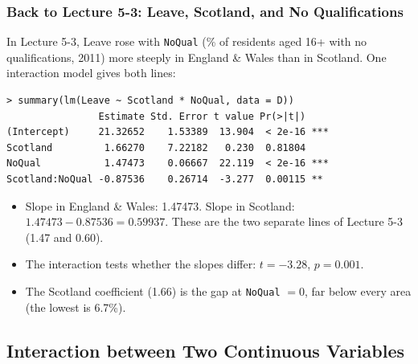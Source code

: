 \documentclass[xcolor=svgnames,9pt,english,aspectratio=169,t]{beamer}
\begin{document}
\begin{frame}[fragile]
\frametitle{Back to Lecture 5-3: Leave, Scotland, and No Qualifications}
\small
In Lecture 5-3, Leave rose with \texttt{NoQual} (\% of residents aged 16+ with no qualifications, 2011) more steeply in England \& Wales than in Scotland. One interaction model gives both lines:
\begin{Verbatim}[fontsize=\footnotesize, frame=single, label=R Code]
> summary(lm(Leave ~ Scotland * NoQual, data = D))
                Estimate Std. Error t value Pr(>|t|)
(Intercept)     21.32652    1.53389  13.904  < 2e-16 ***
Scotland         1.66270    7.22182   0.230  0.81804
NoQual           1.47473    0.06667  22.119  < 2e-16 ***
Scotland:NoQual -0.87536    0.26714  -3.277  0.00115 **
\end{Verbatim}
\begin{itemize}
\item Slope in England \& Wales: 1.47473. Slope in Scotland: $1.47473 - 0.87536 = 0.59937$. These are the two separate lines of Lecture 5-3 (1.47 and 0.60).
\item The interaction tests whether the slopes differ: $t=-3.28$, $p=0.001$.
\item The Scotland coefficient (1.66) is the gap at \texttt{NoQual} $=0$, far below every area (the lowest is 6.7\%).
\end{itemize}
\end{frame}

\subsection{Interaction between Two Continuous Variables}

\end{document}
